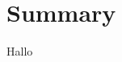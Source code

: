 \documentclass[main]{subfiles}
\begin{document}
\chapter{Summary}\label{ch:summary}

Hallo
\end{document}
